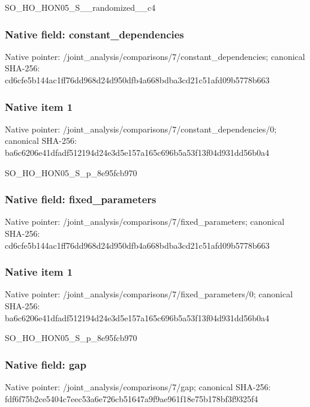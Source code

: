 \documentclass[10pt,a4paper]{article}
\begin{document}
\begingroup\raggedright\sloppy SO\_\allowbreak{}HO\_\allowbreak{}HON05\_\allowbreak{}S\_\allowbreak{}\_\allowbreak{}randomized\_\allowbreak{}\_\allowbreak{}c4\par\endgroup

\subsubsection{Native field: constant\_\allowbreak{}dependencies}
Native pointer: /joint\_\allowbreak{}analysis/comparisons/7/constant\_\allowbreak{}dependencies; canonical SHA-256: cd6cfe5b144ac1ff76dd968d24d950dfb4a668bdba3cd21c51afd09b5778b663

\subsubsection{Native item 1}
Native pointer: /joint\_\allowbreak{}analysis/comparisons/7/constant\_\allowbreak{}dependencies/0; canonical SHA-256: ba6c6206e41dfadf512194d24e3d5e157a165c696b5a53f13f04d931dd56b0a4

\begingroup\raggedright\sloppy SO\_\allowbreak{}HO\_\allowbreak{}HON05\_\allowbreak{}S\_\allowbreak{}p\_\allowbreak{}8e95fcb970\par\endgroup

\subsubsection{Native field: fixed\_\allowbreak{}parameters}
Native pointer: /joint\_\allowbreak{}analysis/comparisons/7/fixed\_\allowbreak{}parameters; canonical SHA-256: cd6cfe5b144ac1ff76dd968d24d950dfb4a668bdba3cd21c51afd09b5778b663

\subsubsection{Native item 1}
Native pointer: /joint\_\allowbreak{}analysis/comparisons/7/fixed\_\allowbreak{}parameters/0; canonical SHA-256: ba6c6206e41dfadf512194d24e3d5e157a165c696b5a53f13f04d931dd56b0a4

\begingroup\raggedright\sloppy SO\_\allowbreak{}HO\_\allowbreak{}HON05\_\allowbreak{}S\_\allowbreak{}p\_\allowbreak{}8e95fcb970\par\endgroup

\subsubsection{Native field: gap}
Native pointer: /joint\_\allowbreak{}analysis/comparisons/7/gap; canonical SHA-256: fdf6f75b2ce5404c7eec53a6e726cb51647a9f9ae961f18e75b178bf3f9325f4
\end{document}
